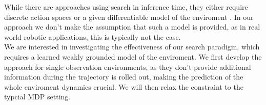 While there are approaches using search in inference time, they either require discrete action spaces \cite{MUZero} or a given differentiable model of the enviroment \cite{Lee_Jeon_Kim_Kim_2020}. 
In our approach we 
don't make the assumption that such a model is provided, as in real world robotic applications, this is typically not the case.\\

We are interested in investigating the effectiveness of our search paradigm, which requires a learned weakly grounded model of the enviroment. We first develop the approach 
for single observation environments, 
as they don't provide additional information during the trajectory is rolled out, making the prediction of the whole enviroment dynamics crucial. We will then relax the constraint to the typcial 
MDP setting.